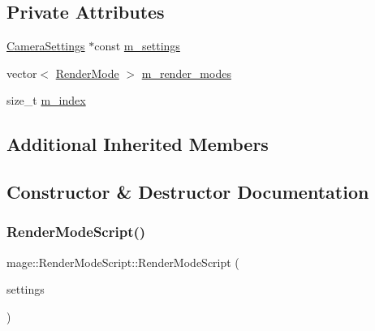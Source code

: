 \subsection*{Private Attributes}
\begin{DoxyCompactItemize}
\item 
\hyperlink{structmage_1_1_camera_settings}{Camera\+Settings} $\ast$const \hyperlink{classmage_1_1_render_mode_script_a536b13e61daa6faa3528f65d29fb252f}{m\+\_\+settings}
\item 
vector$<$ \hyperlink{namespacemage_a5e7e18b0154373ce8fc942fe3f6b27fd}{Render\+Mode} $>$ \hyperlink{classmage_1_1_render_mode_script_af9256e16f26574b138bf68f00951f702}{m\+\_\+render\+\_\+modes}
\item 
size\+\_\+t \hyperlink{classmage_1_1_render_mode_script_adf3d1adbc89db76d3541e0b7aed3b3dd}{m\+\_\+index}
\end{DoxyCompactItemize}
\subsection*{Additional Inherited Members}


\subsection{Constructor \& Destructor Documentation}
\hypertarget{classmage_1_1_render_mode_script_a313a1819a7d769199fe19a0573761e31}{}\label{classmage_1_1_render_mode_script_a313a1819a7d769199fe19a0573761e31} 
\subsubsection{\texorpdfstring{Render\+Mode\+Script()}{RenderModeScript()}\hspace{0.1cm}{\footnotesize\ttfamily [1/3]}}
{\footnotesize\ttfamily mage\+::\+Render\+Mode\+Script\+::\+Render\+Mode\+Script (\begin{DoxyParamCaption}\item[{\hyperlink{structmage_1_1_camera_settings}{Camera\+Settings} $\ast$}]{settings }\end{DoxyParamCaption})}

\hypertarget{classmage_1_1_render_mode_script_ac6b9d813ff57646b4bdcded5f1efdfb1}{}\label{classmage_1_1_render_mode_script_ac6b9d813ff57646b4bdcded5f1efdfb1} 
